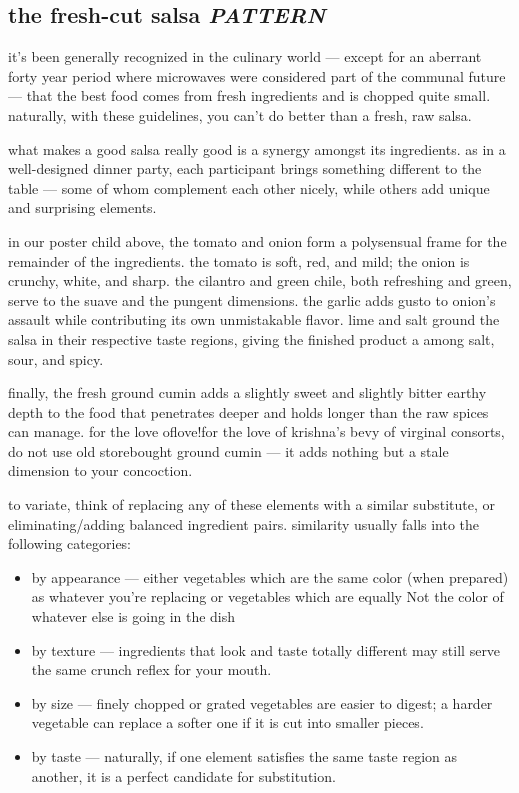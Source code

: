 \subsection{the fresh-cut salsa \textit{PATTERN}}

it's been generally recognized in the culinary world --- except for an
aberrant forty year period where microwaves were considered part of
the communal future --- that the best food comes from fresh
ingredients and is chopped quite small. naturally, with these
guidelines, you can't do better than a fresh, raw salsa.

what makes a good salsa really good is a synergy amongst its
ingredients. as in a well-designed dinner party, each participant
brings something different to the table --- some of whom complement
each other nicely, while others add unique and surprising elements.

in our poster child above, the tomato and onion form a polysensual
frame for the remainder of the ingredients. the tomato is soft, red,
and mild; the onion is crunchy, white, and sharp. the cilantro and
green chile, both refreshing and green, serve to  the suave and
the pungent dimensions. the garlic adds gusto to onion's assault while
contributing its own unmistakable flavor. lime and salt ground the
salsa in their respective taste regions, giving the finished product a
 among salt, sour, and spicy.

finally, the fresh ground cumin adds a slightly sweet and slightly
bitter earthy depth to the food that penetrates deeper and holds
longer than the raw spices can manage. for the love of{love!for the love of} krishna's bevy
of virginal consorts, do not use old storebought ground cumin --- it
adds nothing but a stale dimension to your concoction.

to variate, think of replacing any of these elements with a similar
substitute, or eliminating/adding balanced ingredient
pairs. similarity usually falls into the following categories:

\begin{itemize}
  \item by appearance --- either vegetables which are the same color
  (when prepared) as whatever you're replacing or vegetables which are
  equally Not the color of whatever else is going in the dish

  \item by texture --- ingredients that look and taste totally
  different may still serve the same crunch reflex for your mouth.

  \item by size --- finely chopped or grated vegetables are easier to
  digest; a harder vegetable can replace a softer one if it is cut
  into smaller pieces.

  \item by taste --- naturally, if one element satisfies the same
  taste region as another, it is a perfect candidate for substitution.
\end{itemize}

